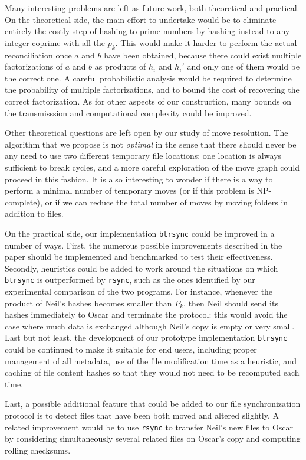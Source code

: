 \documentclass[11pt]{llncs}
\newcommand{\btrsync}{\texttt{btrsync}\xspace}
\newcommand{\rsync}{\texttt{rsync}\xspace}
\begin{document}
Many interesting problems are left as future work, both theoretical and practical. On the theoretical side, the main effort to undertake would be to eliminate entirely the costly step of hashing to prime numbers by hashing instead to any integer coprime with all the $p_k$. This would make it harder to perform the actual reconciliation once $a$ and $b$ have been obtained, because there could exist multiple factorizations of $a$ and $b$ as products of $h_i$ and $h_i'$ and only one of them would be the correct one. A careful probabilistic analysis would be required to determine the probability of multiple factorizations, and to bound the cost of recovering the correct factorization.
As for other aspects of our construction, many bounds on the transmisssion and computational complexity could be improved.

Other theoretical questions are left open by our study of move resolution. The algorithm that we propose is not \emph{optimal} in the sense that there should never be any need to use two different temporary file locations: one location is always sufficient to break cycles, and a more careful exploration of the move graph could proceed in this fashion. It is also interesting to wonder if there is a way to perform a minimal number of temporary moves (or if this problem is NP-complete), or if we can reduce the total number of moves by moving folders in addition to files.

On the practical side, our implementation \btrsync could be improved in a number of ways. First, the numerous possible improvements described in the paper should be implemented and benchmarked to test their effectiveness. Secondly, heuristics could be added to work around the situations on which \btrsync is outperformed by \rsync, such as the ones identified by our experimental comparison of the two programs. For instance, whenever the product of Neil's hashes becomes smaller than $P_k$, then Neil should send its hashes immediately to Oscar and terminate the protocol: this would avoid the case where much data is exchanged although Neil's copy is empty or very small. Last but not least, the development of our prototype implementation \btrsync could be continued to make it suitable for end users, including proper management of all metadata, use of the file modification time as a heuristic, and caching of file content hashes so that they would not need to be recomputed each time.

Last, a possible additional feature that could be added to our file synchronization protocol is to detect files that have been both moved and altered slightly. A related improvement would be to use \rsync to transfer Neil's new files to Oscar by considering simultaneously several related files on Oscar's copy and computing rolling checksums.
\end{document}
